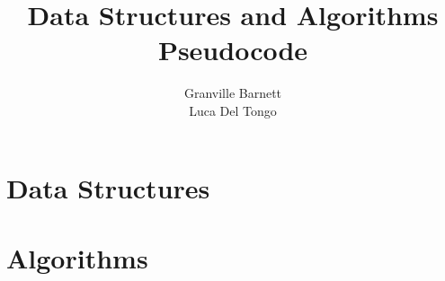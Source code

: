\documentclass[10pt,oneside,a4paper]{report}
\begin{document}
\title{Data Structures and Algorithms\\Pseudocode}
\author{Granville Barnett\\Luca Del Tongo}
\maketitle

\newpage
\tableofcontents
\newpage

\pagestyle{headings}




\part{Data Structures}







\part{Algorithms}






\appendix


\end{document}
